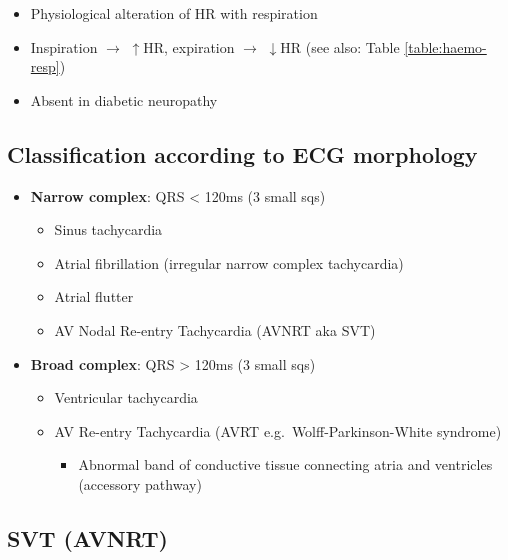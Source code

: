 \documentclass[
  12pt,
]{memoir}
\providecommand{\tightlist}{%
  \setlength{\itemsep}{0pt}\setlength{\parskip}{0pt}}
\begin{document}
\begin{itemize}
\tightlist
\item
  Physiological alteration of HR with respiration
\item
  Inspiration \(\rightarrow\) \(\uparrow\)HR, expiration \(\rightarrow\)
  \(\downarrow\)HR (see also: Table \ref{table:haemo-resp})
\item
  Absent in diabetic neuropathy
\end{itemize}

\hypertarget{classification-according-to-ecg-morphology}{%
\subsection{Classification according to ECG
morphology}\label{classification-according-to-ecg-morphology}}

\begin{itemize}
\tightlist
\item
  \textbf{Narrow complex}: QRS \textless{} 120ms (3 small sqs)

  \begin{itemize}
  \tightlist
  \item
    Sinus tachycardia
  \item
    Atrial fibrillation (irregular narrow complex tachycardia)
  \item
    Atrial flutter
  \item
    AV Nodal Re-entry Tachycardia (AVNRT aka SVT)
  \end{itemize}
\item
  \textbf{Broad complex}: QRS \textgreater{} 120ms (3 small sqs)

  \begin{itemize}
  \tightlist
  \item
    Ventricular tachycardia
  \item
    AV Re-entry Tachycardia (AVRT e.g.~Wolff-Parkinson-White syndrome)

    \begin{itemize}
    \tightlist
    \item
      Abnormal band of conductive tissue connecting atria and ventricles
      (accessory pathway)
    \end{itemize}
  \end{itemize}
\end{itemize}

\hypertarget{svt-avnrt}{%
\subsection{SVT (AVNRT)}\label{svt-avnrt}}
\end{document}
